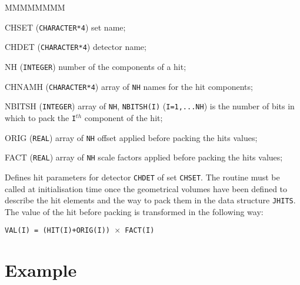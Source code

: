      
     


\begin{DLtt}{MMMMMMMM}
\item[CHSET] ({\tt CHARACTER*4}) set name;
\item[CHDET] ({\tt CHARACTER*4}) detector name;
\item[NH] ({\tt INTEGER}) number of the components of a hit;
\item[CHNAMH] ({\tt CHARACTER*4}) array of {\tt NH} names for the hit components;
\item[NBITSH] ({\tt INTEGER}) array of {\tt NH}, 
{\tt NBITSH(I)} ({\tt I=1,...NH}) is the number of bits in which to pack
the {\tt I$^{th}$} component of the hit;
\item[ORIG] ({\tt REAL}) array of {\tt NH} offset applied before packing
the hits values;
\item[FACT] ({\tt REAL}) array of {\tt NH} scale factors applied before packing
the hits values;
\end{DLtt}

Defines hit parameters for detector {\tt CHDET} of set {\tt CHSET}.
The routine must be called at initialisation time once the
geometrical volumes have been defined to describe
the hit elements and the way to pack them in the data structure {\tt JHITS}.
The value of the hit before packing is transformed in the following way:

\begin{center}
\tt VAL(I) = (HIT(I)+ORIG(I)) $\times$ FACT(I)
\end{center}

\section*{Example}

